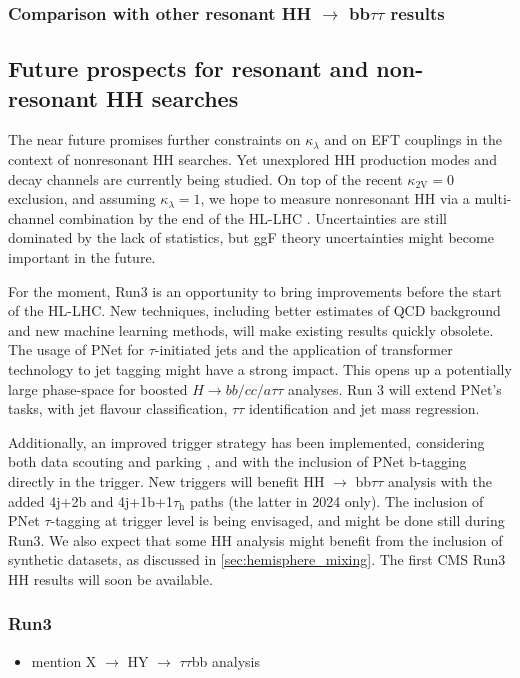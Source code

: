 \documentclass[11pt]{article}
\newcommand{\bbtt}{HH $\rightarrow$ bb$\tau\tau$}
\newcommand{\kl}{\kappa_{\lambda}}
\newcommand{\kvv}{\kappa_{\text{2V}}}
\newcommand{\reshybbtt}{X $\rightarrow$ HY $\rightarrow$ $\tau\tau$bb}
\newcommand{\tauh}{$\tau_{\text{h}}$}
\begin{document}
\subsubsection{Comparison with other resonant \bbtt{} results}
\label{sec:org8c64d3d}
\subsection{Future prospects for resonant and non-resonant HH searches}
\label{sec:orgbdb6c55}
\label{sec::future}

The near future promises further constraints on \(\kl\) and on \ac{EFT} couplings in the context of nonresonant HH searches.
Yet unexplored HH production modes and decay channels are currently being studied.
On top of the recent \(\kvv=0\) exclusion, and assuming \(\kl=1\), we hope to measure nonresonant HH via a multi-channel combination by the end of the \ac{HL-LHC} \cite{higgs_10_years}.
Uncertainties are still dominated by the lack of statistics, but \ac{ggF} theory uncertainties might become important in the future.

For the moment, Run3 is an opportunity to bring improvements before the start of the \ac{HL-LHC}.
New techniques, including better estimates of \ac{QCD} background and new machine learning methods, will make existing results quickly obsolete.
The usage of \ac{PNet} \cite{particle_net} for \(\tau\)-initiated jets and the application of transformer technology to jet tagging \cite{particle_transformer} might have a strong impact.
This opens up a potentially large phase-space for boosted \(H\rightarrow bb/cc/a\tau\tau\) analyses.
Run 3 will extend \ac{PNet}'s tasks, with jet flavour classification, \(\tau\tau\) identification and jet mass regression.

Additionally, an improved trigger strategy has been implemented, considering both data scouting and parking \cite{parking_scouting_run3_cms}, and with the inclusion of \ac{PNet} b-tagging directly in the trigger.
New triggers will benefit \bbtt{} analysis with the added 4j+2b and 4j+1b+1\tauh{} paths (the latter in 2024 only).
The inclusion of \ac{PNet} \(\tau\)-tagging at trigger level is being envisaged, and might be done still during Run3.
We also expect that some HH analysis might benefit from the inclusion of synthetic datasets, as discussed in \cref{sec:hemisphere_mixing}.
The first \ac{CMS} Run3 HH results will soon be available.

\subsubsection{Run3}
\label{sec:org310814a}
\begin{itemize}
\item mention \reshybbtt{} analysis
\end{itemize}
\end{document}
